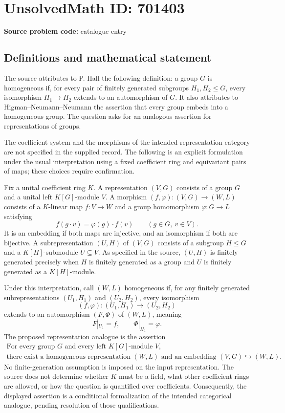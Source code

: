\documentclass[11pt]{article}
\begin{document}
\section*{UnsolvedMath ID: 701403}
\textbf{Source problem code:} catalogue entry
\subsection{Definitions and mathematical statement}
The source attributes to P. Hall the following definition: a group \(G\) is homogeneous if, for every pair of finitely generated subgroups \(H_1,H_2\leq G\), every isomorphism \(H_1\to H_2\) extends to an automorphism of \(G\). It also attributes to Higman--Neumann--Neumann the assertion that every group embeds into a homogeneous group. The question asks for an analogous assertion for representations of groups.

The coefficient system and the morphisms of the intended representation category are not specified in the supplied record. The following is an explicit formulation under the usual interpretation using a fixed coefficient ring and equivariant pairs of maps; these choices require confirmation.

Fix a unital coefficient ring \(K\). A representation \((V,G)\) consists of a group \(G\) and a unital left \(K[G]\)-module \(V\). A morphism \((f,\varphi):(V,G)\to(W,L)\) consists of a \(K\)-linear map \(f:V\to W\) and a group homomorphism \(\varphi:G\to L\) satisfying
\[
f(g\cdot v)=\varphi(g)\cdot f(v)\qquad(g\in G,\ v\in V).
\]
It is an embedding if both maps are injective, and an isomorphism if both are bijective. A subrepresentation \((U,H)\) of \((V,G)\) consists of a subgroup \(H\leq G\) and a \(K[H]\)-submodule \(U\subseteq V\). As specified in the source, \((U,H)\) is finitely generated precisely when \(H\) is finitely generated as a group and \(U\) is finitely generated as a \(K[H]\)-module.

Under this interpretation, call \((W,L)\) homogeneous if, for any finitely generated subrepresentations \((U_1,H_1)\) and \((U_2,H_2)\), every isomorphism
\[
(f,\varphi):(U_1,H_1)\longrightarrow(U_2,H_2)
\]
extends to an automorphism \((F,\Phi)\) of \((W,L)\), meaning
\[
F|_{U_1}=f,\qquad \Phi|_{H_1}=\varphi.
\]
The proposed representation analogue is the assertion
\[
\begin{gathered}
\text{For every group }G\text{ and every left }K[G]\text{-module }V,\\
\text{there exist a homogeneous representation }(W,L)
\text{ and an embedding }(V,G)\hookrightarrow(W,L).
\end{gathered}
\]
No finite-generation assumption is imposed on the input representation. The source does not determine whether \(K\) must be a field, what other coefficient rings are allowed, or how the question is quantified over coefficients. Consequently, the displayed assertion is a conditional formalization of the intended categorical analogue, pending resolution of those qualifications.
\end{document}
